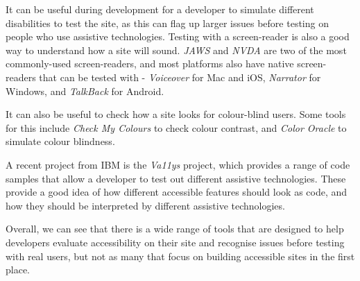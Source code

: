 \documentclass[ %
                    author={Aleena Baig},
                supervisor={Dr Simon Lock},
                    degree={BSc},
                     title={On Making Web Accessible Graphs},
                  subtitle={},
                      year={2019} ]{dissertation}
\begin{document}
It can be useful during development for a developer to simulate different disabilities to test the site, as this can flag up larger issues before testing on people who use assistive technologies. Testing with a screen-reader is also a good way to understand how a site will sound. \textit{JAWS} and \textit{NVDA} are two of the most commonly-used screen-readers, and most platforms also have native screen-readers that can be tested with - \textit{Voiceover} for Mac and iOS, \textit{Narrator} for Windows, and \textit{TalkBack} for Android.

It can also be useful to check how a site looks for colour-blind users. Some tools for this include \textit{Check My Colours} to check colour contrast, and \textit{Color Oracle} to simulate colour blindness.

A recent project from IBM is the \textit{Va11ys} project, which provides a range of code samples that allow a developer to test out different assistive technologies. These provide a good idea of how different accessible features should look as code, and how they should be interpreted by different assistive technologies.

Overall, we can see that there is a wide range of tools that are designed to help developers evaluate accessibility on their site and recognise issues before testing with real users, but not as many that focus on building accessible sites in the first place.
\end{document}
